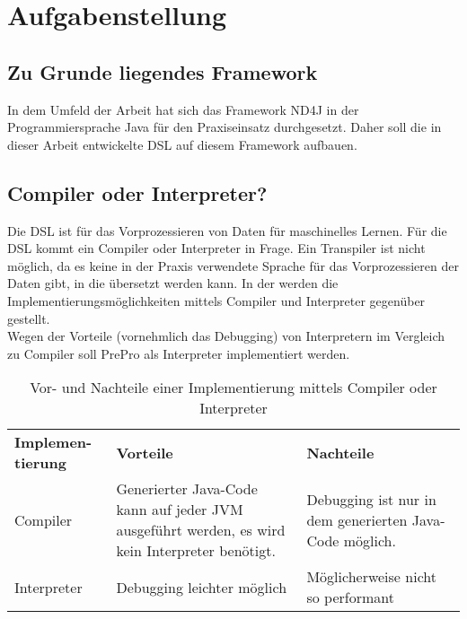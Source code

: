 \chapter{Aufgabenstellung}
\section{Zu Grunde liegendes Framework}
In dem Umfeld der Arbeit hat sich das Framework ND4J in der Programmiersprache Java für den Praxiseinsatz durchgesetzt.
Daher soll die in dieser Arbeit entwickelte \ac{DSL} auf diesem Framework aufbauen.

\section{Compiler oder Interpreter?}
Die \ac{DSL} ist für das Vorprozessieren von Daten für maschinelles Lernen.
Für die \ac{DSL} kommt ein Compiler oder Interpreter in Frage.
Ein Transpiler ist nicht möglich, da es keine in der Praxis verwendete Sprache für das Vorprozessieren der Daten gibt, in die übersetzt werden kann.
In der  werden die Implementierungsmöglichkeiten mittels Compiler und Interpreter gegenüber gestellt.\\
Wegen der Vorteile (vornehmlich das Debugging) von Interpretern im Vergleich zu Compiler soll PrePro als Interpreter implementiert werden.

\begin{table}[H]
	\centering
	\begin{tabular}{ | p{3cm} | p{6cm} | p{6cm} | }
		\hline \rowcolor{gray!15}
		\textbf{Implemen-tierung} & \textbf{Vorteile} & \textbf{Nachteile} \\ \hhline{|=|=|=|}
		Compiler & Generierter Java-Code kann auf jeder \ac{JVM} ausgeführt werden, es wird kein Interpreter benötigt. & Debugging ist nur in dem generierten Java-Code möglich. \\ \hline
		Interpreter & Debugging leichter möglich & Möglicherweise nicht so performant \\ \hline
	\end{tabular}
	\caption{Vor- und Nachteile einer Implementierung mittels Compiler oder Interpreter}
	\label{tab:Vorteile_Compiler_Interpreter}
\end{table}

